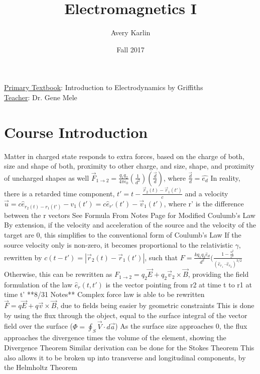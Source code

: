 \documentclass[11 pt, twoside]{article}
\newenvironment{outline*}
{
	\begin{outline}[enumerate]
	}
	{\end{outline}
}
\begin{document}
\title{Electromagnetics I}
\author{Avery Karlin}
\date{Fall 2017}
\newcommand{\textbook}{Introduction to Electrodynamics by Griffiths}
\newcommand{\teacher}{Dr. Gene Mele}

\maketitle
\newpage
\hypertarget{content}{\tableofcontents}
\vspace{11pt}
\noindent
\underline{Primary Textbook}: \textbook\\
\underline{Teacher}: \teacher
\newpage

\section{Course Introduction}
\begin{outline*}
\1 Matter in charged state responds to extra forces, based on the charge of both, size and shape of both, proximity to other charge, and size, shape, and proximity of uncharged shapes as well
	\2 $\vec{F}_{1\to2} = \frac{q_1q_2}{4\pi\epsilon_0}(\frac{1}{d^2})(\frac{\vec{d}}{d})$, where $\frac{\vec{d}}{d} = \hat{e_d}$
	\2 In reality, there is a retarded time component, $t' = t - \frac{\vec{r}_2(t) - \vec{r}_1(t')}{c}$ and a velocity $\vec{u} = c\hat{e}_{r_2(t) - r_1(t')} - v_1(t') = c\hat{e}_{r'}(t') - \vec{v}_1(t')$, where r' is the difference between the r vectors
		\3 See Formula From Notes Page for Modified Coulumb's Law
		\3 By extension, if the velocity and acceleration of the source and the velocity of the target are 0, this simplifies to the conventional form of Coulumb's Law
		\3 If the source velocity only is non-zero, it becomes proportional to the relativistic $\gamma$, rewritten by $c(t - t') = |\vec{r}_2(t) - \vec{r}_1(t')|$, such that $F = \frac{kq_1q_2\hat{e}_{d}}{d^2}(\frac{1 - \frac{v_1^2}{c^2}}{(\hat{e}_{r_1} \cdot \hat{e}_{r_2})^{3/2}}$
		\3 Otherwise, this can be rewritten as $F_{1\to2} = q_2\vec{E} + q_2\vec{v}_2 \times \vec{B}$, providing the field formulation of the law
\1 $\hat{e}_r(t, t')$ is the vector pointing from r2 at time t to r1 at time t'
\1 **8/31 Notes**
\1 Complex force law is able to be rewritten $\vec{F} = q\vec{E} + q\vec{v} \times \vec{B}$, due to fields being easier by geometric constraints
	\2 This is done by using the flux through the object, equal to the surface integral of the vector field over the surface ($\Phi = \oint_S \vec{V} \cdot d\vec{a}$)
		\3 As the surface size approaches 0, the flux approaches the divergence times the volume of the element, showing the Divergence Theorem
		\3 Similar derivation can be done for the Stokes Theorem
	\2 This also allows it to be broken up into transverse and longitudinal components, by the Helmholtz Theorem
\end{outline*}
\end{document}
